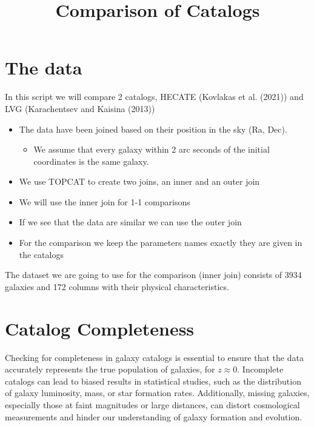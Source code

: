 \documentclass[
]{article}
\title{Comparison of Catalogs}
\author{}
\date{}
\providecommand{\tightlist}{%
  \setlength{\itemsep}{0pt}\setlength{\parskip}{0pt}}\usepackage{longtable,booktabs,array}
\renewcommand*\contentsname{Table of contents}
\newcommand\contentsname{Table of contents}
\begin{document}
\maketitle

\renewcommand*\contentsname{Table of contents}
{
\hypersetup{linkcolor=}
\setcounter{tocdepth}{3}
\tableofcontents
}
\section{The data}\label{the-data}

In this script we will compare 2 catalogs, HECATE (Kovlakas et al.
(2021)) and LVG (Karachentsev and Kaisina (2013))

\begin{itemize}
\tightlist
\item
  The data have been joined based on their position in the sky (Ra,
  Dec).

  \begin{itemize}
  \tightlist
  \item
    We assume that every galaxy within 2 arc seconds of the initial
    coordinates is the same galaxy.
  \end{itemize}
\item
  We use TOPCAT to create two joins, an inner and an outer join
\item
  We will use the inner join for 1-1 comparisons
\item
  If we see that the data are similar we can use the outer join
\item
  For the comparison we keep the parameters names exactly they are given
  in the catalogs
\end{itemize}

The dataset we are going to use for the comparison (inner join) consists
of 3934 galaxies and 172 columns with their physical characteristics.

\section{Catalog Completeness}\label{catalog-completeness}

Checking for completeness in galaxy catalogs is essential to ensure that
the data accurately represents the true population of galaxies, for
\(z \approx 0\). Incomplete catalogs can lead to biased results in
statistical studies, such as the distribution of galaxy luminosity,
mass, or star formation rates. Additionally, missing galaxies,
especially those at faint magnitudes or large distances, can distort
cosmological measurements and hinder our understanding of galaxy
formation and evolution.
\end{document}
